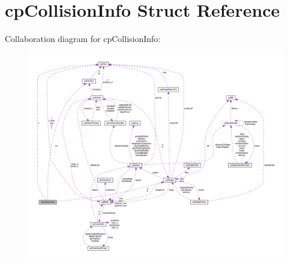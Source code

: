\hypertarget{structcpCollisionInfo}{}\section{cp\+Collision\+Info Struct Reference}
\label{structcpCollisionInfo}


Collaboration diagram for cp\+Collision\+Info\+:
\nopagebreak
\begin{figure}[H]
\begin{center}
\leavevmode
\includegraphics[width=350pt]{structcpCollisionInfo__coll__graph}
\end{center}
\end{figure}
